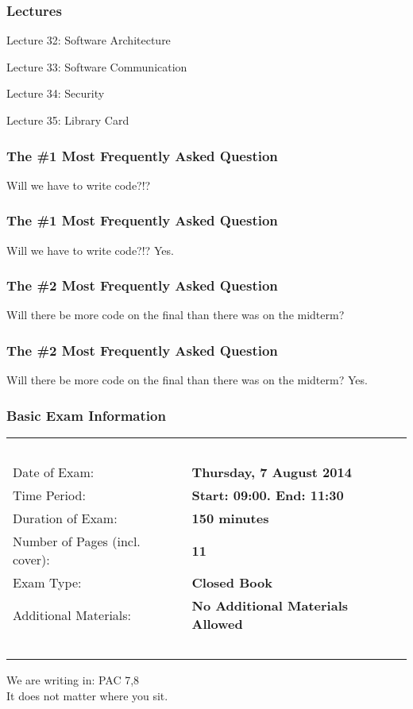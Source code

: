 \begin{frame}
\frametitle{Lectures}
{\LARGE

Lecture 32: Software Architecture

Lecture 33: Software Communication

Lecture 34: Security

Lecture 35: Library Card
}

\end{frame}



\begin{frame}
\frametitle{The \#1 Most Frequently Asked Question}

{\LARGE
Will we have to write code?!?
}

\end{frame}

\begin{frame}
\frametitle{The \#1 Most Frequently Asked Question}

{\LARGE
Will we have to write code?!? \alert{Yes.}
}

\end{frame}

\begin{frame}
\frametitle{The \#2 Most Frequently Asked Question}

{\LARGE
Will there be more code on the final than there was on the midterm?
}

\end{frame}

\begin{frame}
\frametitle{The \#2 Most Frequently Asked Question}

{\LARGE
Will there be more code on the final than there was on the midterm? \alert{Yes.}
}

\end{frame}


\begin{frame}
\frametitle{Basic Exam Information}

\begin{table}[h]
 \begin{tabular}{|l l|}
        	\hline
			~ & ~ \\	
			Date of Exam: & \textbf{Thursday, 7 August 2014} \\
			Time Period: & \textbf{Start: 09:00. End: 11:30}\\
			Duration of Exam: & \textbf{150 minutes}\\
			Number of Pages (incl. cover): & \textbf{11}\\
			Exam Type: & \textbf{Closed Book}\\
			Additional Materials: & \textbf{No Additional Materials Allowed}\\
			~ & ~\\
			\hline
          \end{tabular}
\end{table}

We are writing in: PAC 7,8 \\
It does not matter where you sit.

\end{frame}


